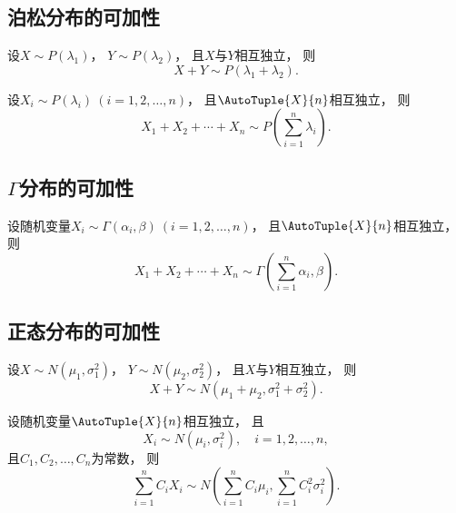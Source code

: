 \subsection{泊松分布的可加性}
\begin{theorem}\label{theorem:多维随机变量及其分布.泊松分布的可加性1}
设\(X \sim P(\lambda_1)\)，
\(Y \sim P(\lambda_2)\)，
且\(X\)与\(Y\)相互独立，
则\[
	X+Y \sim P(\lambda_1 + \lambda_2).
\]
\end{theorem}

\begin{corollary}\label{theorem:多维随机变量及其分布.泊松分布的可加性2}
设\(X_i \sim P(\lambda_i)\ (i=1,2,\dotsc,n)\)，
且\(\AutoTuple{X}{n}\)相互独立，
则\[
	X_1+X_2+\dotsb+X_n \sim P\left(\sum_{i=1}^n \lambda_i\right).
\]
\end{corollary}

\subsection{\texorpdfstring{\(\Gamma\)分布的可加性}{伽马分布的可加性}}
\begin{theorem}\label{theorem:多维随机变量及其分布.伽马分布的可加性1}
设随机变量\(X_i \sim \Gamma(\alpha_i,\beta)\ (i=1,2,\dotsc,n)\)，
且\(\AutoTuple{X}{n}\)相互独立，
则\[
	X_1+X_2+\dotsb+X_n
	\sim
	\Gamma\left(\sum_{i=1}^n \alpha_i,\beta\right).
\]
\end{theorem}

\subsection{正态分布的可加性}
\begin{theorem}\label{theorem:正态分布与自然指数分布族.正态分布的可加性1}
设\(X \sim N(\mu_1,\sigma_1^2)\)，
\(Y \sim N(\mu_2,\sigma_2^2)\)，
且\(X\)与\(Y\)相互独立，
则\begin{equation}
	X+Y \sim N(\mu_1+\mu_2,\sigma_1^2+\sigma_2^2).
\end{equation}
\end{theorem}

\begin{corollary}\label{theorem:正态分布与自然指数分布族.正态分布的可加性2}
设随机变量\(\AutoTuple{X}{n}\)相互独立，
且\[
	X_i \sim N(\mu_i,\sigma_i^2),
	\quad i=1,2,\dotsc,n,
\]
且\(C_1,C_2,\dotsc,C_n\)为常数，
则\begin{equation}
	\sum_{i=1}^n {C_i X_i}
	\sim N\left(
	\sum_{i=1}^n {C_i \mu_i},
	\sum_{i=1}^n {C_i^2 \sigma_i^2}
	\right).
\end{equation}
\end{corollary}

